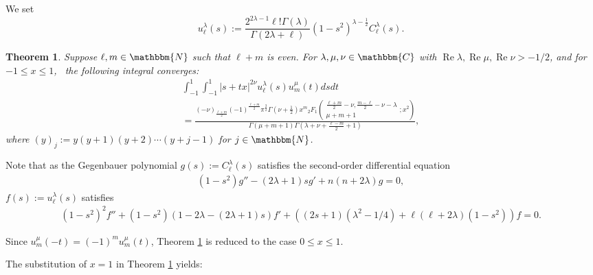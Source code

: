 \documentclass[12pt]{article}
\numberwithin{equation}{section}
\newcommand{\assign}{:=}
\newcommand{\tmop}[1]{\ensuremath{\operatorname{#1}}}
\newtheorem{theorem}[corollary]{Theorem}
\begin{document}
We set
\[ u_{\ell}^{\lambda} (s) \assign \frac{2^{2 \lambda - 1} \ell ! \Gamma
   (\lambda)}{\Gamma (2 \lambda + \ell)} (1 - s^2)^{\lambda - \frac{1}{2}}
   C_{\ell}^{\lambda} (s) . \]
\begin{theorem}
  \label{main-thm}Suppose $\ell, m \in \mathbbm{N}$ such that $\ell + m$ is
  even. For $\lambda, \mu, \nu \in \mathbbm{C}$ with $\tmop{Re} \lambda,
  \tmop{Re} \mu, \tmop{Re} \nu > - 1 / 2$, and for $- 1 \leqslant x \leqslant
  1$, \ the following integral converges:
  \begin{eqnarray}
    & \displaystyle\int_{- 1}^1 \displaystyle\int_{- 1}^1 | s + t x |^{2 \nu} u_{\ell}^{\lambda} (s)
    u_m^{\mu} (t) d s d t &  \nonumber\\
    & \displaystyle= \frac{(- \nu)_{\frac{\ell + m}{2}} (- 1)^{\frac{\ell + m}{2}}
    \pi^{\frac{3}{2}} \Gamma \left( \nu + \frac{1}{2} \right) x^m{}_2 F_1
    \left( \begin{array}{c}
      \frac{\ell + m}{2} - \nu, \frac{m - \ell}{2} - \nu - \lambda\\
      \mu + m + 1
    \end{array} ; x^2 \right)}{\Gamma (\mu + m + 1) \Gamma \left( \lambda +
    \nu + \frac{\ell - m}{2} + 1 \right)},  \label{eqn:main} & 
  \end{eqnarray}
  where $(y)_j \assign y (y + 1) (y + 2) \cdots (y + j - 1)$ for $j \in
  \mathbbm{N}$.
\end{theorem}

Note that as the Gegenbauer polynomial $g (s) \assign C_{\ell}^{\lambda} (s)$
satisfies the second-order differential equation
\begin{eqnarray}
  & (1 - s^2) g'' - (2 \lambda + 1) s g' + n (n + 2 \lambda) g = 0, & 
  \nonumber
\end{eqnarray}
$f (s) \assign u_{\ell}^{\lambda} (s)$ satisfies
\begin{eqnarray}
  & (1 - s^2)^2 f'' + (1 - s^2) (1 - 2 \lambda - (2 \lambda + 1) s) f' + ((2
  s + 1) (\lambda^2 - 1 / 4) + \ell (\ell + 2 \lambda) (1 - s^2)) f = 0. & 
  \nonumber
\end{eqnarray}
\begin{remark}
  Since $u_m^{\mu} (- t) = (- 1)^m u_m^{\mu} (t)$, Theorem \ref{main-thm} is
  reduced to the case $0 \leqslant x \leqslant 1$.
\end{remark}

The substitution of $x = 1$ in Theorem \ref{main-thm} yields:
\end{document}

